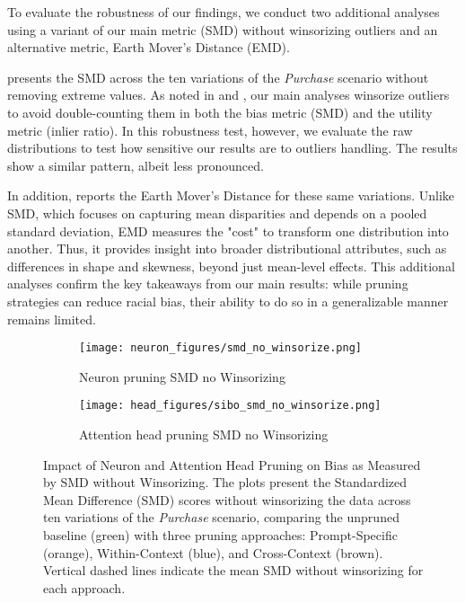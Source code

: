 To evaluate the robustness of our findings, we conduct two additional analyses using a variant of our main metric (SMD) without winsorizing outliers and an alternative metric, Earth Mover's Distance (EMD).

 presents the SMD across the ten variations of the \textit{Purchase} scenario without removing extreme values. As noted in  and , our main analyses winsorize outliers to avoid double-counting them in both the bias metric (SMD) and the utility metric (inlier ratio). In this robustness test, however, we evaluate the raw distributions to test how sensitive our results are to outliers handling. The results show a similar pattern, albeit less pronounced. 

In addition,  reports the Earth Mover's Distance for these same variations. Unlike SMD, which focuses on capturing mean disparities and depends on a pooled standard deviation, EMD measures the "cost" to transform one distribution into another. Thus, it provides insight into broader distributional attributes, such as differences in shape and skewness, beyond just mean-level effects. This additional analyses confirm the key takeaways from our main results: while pruning strategies can reduce racial bias, their ability to do so in a generalizable manner remains limited. 

\begin{figure}[t]
  \centering
  \begin{subfigure}[b]{0.49\linewidth}
      \centering
      \texttt{[image: neuron\_figures/smd\_no\_winsorize.png]}
      \caption{Neuron pruning SMD no Winsorizing}
      \label{fig-robust-smd-neuron}
  \end{subfigure}
  \hfill
  \begin{subfigure}[b]{0.49\linewidth}
      \centering
      \texttt{[image: head\_figures/sibo\_smd\_no\_winsorize.png]}
      \caption{Attention head pruning SMD no Winsorizing}
      \label{fig-robust-smd-head}
  \end{subfigure}
  \caption{Impact of Neuron and Attention Head Pruning on Bias as Measured by SMD without Winsorizing. The plots present the Standardized Mean Difference (SMD) scores without winsorizing the data across ten variations of the \textit{Purchase} scenario, comparing the unpruned baseline (green) with three pruning approaches: Prompt-Specific (orange), Within-Context (blue), and Cross-Context (brown). Vertical dashed lines indicate the mean SMD without winsorizing for each approach.}
  \label{fig-robust-smd-combined}
\end{figure}

